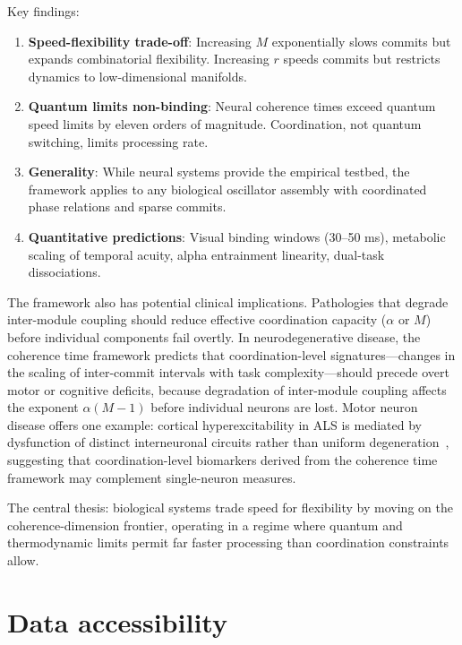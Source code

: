 \documentclass[12pt]{article}
\begin{document}
Key findings:
\begin{enumerate}
\item \textbf{Speed-flexibility trade-off}: Increasing $M$ exponentially slows commits but expands combinatorial flexibility. Increasing $r$ speeds commits but restricts dynamics to low-dimensional manifolds.

\item \textbf{Quantum limits non-binding}: Neural coherence times exceed quantum speed limits by eleven orders of magnitude. Coordination, not quantum switching, limits processing rate.

\item \textbf{Generality}: While neural systems provide the empirical testbed, the framework applies to any biological oscillator assembly with coordinated phase relations and sparse commits.

\item \textbf{Quantitative predictions}: Visual binding windows (30--50 ms), metabolic scaling of temporal acuity, alpha entrainment linearity, dual-task dissociations.
\end{enumerate}

The framework also has potential clinical implications. Pathologies that degrade inter-module coupling should reduce effective coordination capacity ($\alpha$ or $M$) before individual components fail overtly. In neurodegenerative disease, the coherence time framework predicts that coordination-level signatures---changes in the scaling of inter-commit intervals with task complexity---should precede overt motor or cognitive deficits, because degradation of inter-module coupling affects the exponent $\alpha(M-1)$ before individual neurons are lost. Motor neuron disease offers one example: cortical hyperexcitability in ALS is mediated by dysfunction of distinct interneuronal circuits rather than uniform degeneration~\cite{pavey2024}, suggesting that coordination-level biomarkers derived from the coherence time framework may complement single-neuron measures.

The central thesis: biological systems trade speed for flexibility by moving on the coherence-dimension frontier, operating in a regime where quantum and thermodynamic limits permit far faster processing than coordination constraints allow.

\section*{Data accessibility}
\end{document}
